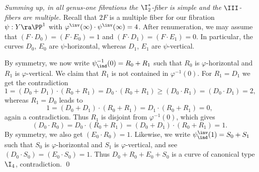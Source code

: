 \emph{Summing up, in  all genus-one fibrations the $\I_2^*$-fiber   is simple and the $\III$-fibers
are multiple.} Recall that $2F$ is a multiple fiber for our fibration $\psi:Y\ra\PP^1$ with $\varphi^\inv(\infty)\cdot\psi^\inv(\infty)=4$.
After renumeration, we may assume that $(F\cdot D_0)=(F\cdot E_0)=1$ and $(F\cdot D_1)=(F\cdot E_1)=0$.
In particular, the curves $D_0$, $E_0$ are $\psi$-horizontal, whereas $D_1$, $E_1$ are $\psi$-vertical.

By symmetry, we now write  $\psi^{-1}_\ind(0)=R_0+R_1$ such that $R_0$ is $\varphi$-horizontal and  $R_1$ is $\varphi$-vertical.
We claim that $R_1$ is not contained in $\varphi^{-1}(0)$.
For $R_1=D_1$ we get the contradiction
$$
1=(D_0+D_1)\cdot (R_0+R_1) = D_0\cdot (R_0+R_1)\geq (D_0\cdot R_1)=(D_0\cdot D_1)=2,
$$
whereas $R_1=D_0$ leads to
$$
1=(D_0+D_1)\cdot (R_0+R_1) = D_1\cdot(R_0+R_1)    = 0,
$$
again a contradiction. Thus $R_1$ is disjoint from $\varphi^{-1}(0)$, which gives
$$
(D_0\cdot R_0) = D_0\cdot (R_0+R_1) = (D_0+D_1)\cdot (R_0+R_1) = 1.
$$
By symmetry, we also get $(E_0\cdot R_0)=1$.
Likewise, we write $\psi^\inv_\ind(1)=S_0+S_1$ such that $S_0$ is $\varphi$-horizontal and  $S_1$ is $\varphi$-vertical,
and see $(D_0\cdot S_0)=(E_0\cdot S_0)=1$.
Thus   $D_0+ R_0+E_0+S_0$ is a curve of canonical type $\I_4$, contradiction.
\qed


